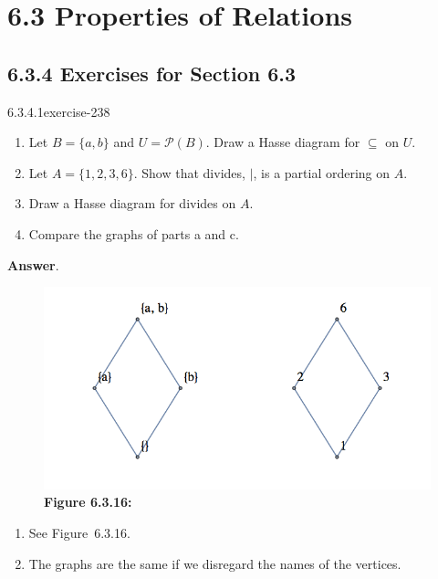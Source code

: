 \documentclass[twoside,10pt,]{book}
\numberwithin{equation}{section}
\begin{document}
\section*{6.3 Properties of Relations}
\subsection*{6.3.4 Exercises for Section 6.3}
\begin{divisionsolution}{6.3.4.1}{}{exercise-238}%
\hypertarget{p-2049}{}%
\leavevmode%
\begin{enumerate}[label=(\alph*)]
\item\hypertarget{li-1078}{}\hypertarget{p-2050}{}%
Let \(B = \{a, b\}\) and \(U = \mathcal{P}(B)\). Draw a Hasse diagram for \(\subseteq \) on \(U\).%
\item\hypertarget{li-1079}{}\hypertarget{p-2051}{}%
Let \(A = \{1,2, 3, 6\}\). Show that divides, \(\mid \), is a partial ordering on \(A\).%
\item\hypertarget{li-1080}{}\hypertarget{p-2052}{}%
Draw a Hasse diagram for divides on \(A\).%
\item\hypertarget{li-1081}{}\hypertarget{p-2053}{}%
Compare the graphs of parts a and c.%
\end{enumerate}
%
\par\smallskip%
\noindent\textbf{Answer}.\quad%
\leavevmode%
\begin{figure}
\centering
\includegraphics[width=1\linewidth]{images/fig-sol-6-3-1.png}
\caption*{\textbf{Figure 6.3.16:} }
\end{figure}
\hypertarget{p-2054}{}%
\leavevmode%
\begin{enumerate}[label=(\alph*)]
\item\hypertarget{li-1082}{}\hypertarget{p-2055}{}%
See Figure~6.3.16.%
\item\hypertarget{li-1083}{}\hypertarget{p-2056}{}%
The graphs are the same if we disregard the names of the vertices.%
\end{enumerate}
%
\end{divisionsolution}%
\end{document}
